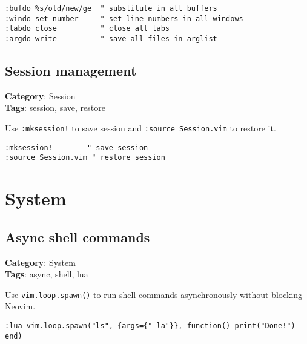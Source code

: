 {{{{{{{{{{{{{{\begin{Exa*}{}
\begin{Verbatim}[fontsize=\footnotesize, breaklines, breakanywhere]
:bufdo %s/old/new/ge  " substitute in all buffers
:windo set number     " set line numbers in all windows
:tabdo close          " close all tabs
:argdo write          " save all files in arglist
\end{Verbatim}
\end{Exa*}

\section{Session management}

\textbf{Category}: Session\\ \textbf{Tags}: session, save, restore
\vspace{0.5cm}

Use {\footnotesize \Verb§:mksession!§} to save session and {\footnotesize \Verb§:source Session.vim§} to restore it.

\begin{Exa*}{}
\begin{Verbatim}[fontsize=\footnotesize, breaklines, breakanywhere]
:mksession!        " save session
:source Session.vim " restore session
\end{Verbatim}
\end{Exa*}

\chapter{System}
\section{Async shell commands}

\textbf{Category}: System\\ \textbf{Tags}: async, shell, lua
\vspace{0.5cm}

Use {\footnotesize \Verb§vim.loop.spawn()§} to run shell commands asynchronously without blocking Neovim.

\begin{Exa*}{}
\begin{Verbatim}[fontsize=\footnotesize, breaklines, breakanywhere]
:lua vim.loop.spawn("ls", {args={"-la"}}, function() print("Done!") end)
\end{Verbatim}
\end{Exa*}

}}}}}}}}}}}}}}
